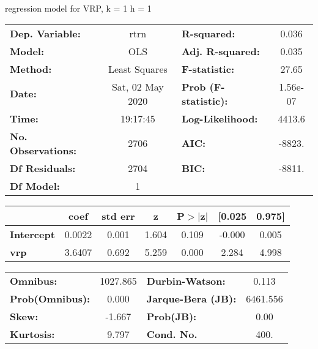 regression model for VRP, k = 1 h = 1\begin{center}
\begin{tabular}{lclc}
\toprule
\textbf{Dep. Variable:}    &       rtrn       & \textbf{  R-squared:         } &     0.036   \\
\textbf{Model:}            &       OLS        & \textbf{  Adj. R-squared:    } &     0.035   \\
\textbf{Method:}           &  Least Squares   & \textbf{  F-statistic:       } &     27.65   \\
\textbf{Date:}             & Sat, 02 May 2020 & \textbf{  Prob (F-statistic):} &  1.56e-07   \\
\textbf{Time:}             &     19:17:45     & \textbf{  Log-Likelihood:    } &    4413.6   \\
\textbf{No. Observations:} &        2706      & \textbf{  AIC:               } &    -8823.   \\
\textbf{Df Residuals:}     &        2704      & \textbf{  BIC:               } &    -8811.   \\
\textbf{Df Model:}         &           1      & \textbf{                     } &             \\
\bottomrule
\end{tabular}
\begin{tabular}{lcccccc}
                   & \textbf{coef} & \textbf{std err} & \textbf{z} & \textbf{P$> |$z$|$} & \textbf{[0.025} & \textbf{0.975]}  \\
\midrule
\textbf{Intercept} &       0.0022  &        0.001     &     1.604  &         0.109        &       -0.000    &        0.005     \\
\textbf{vrp}       &       3.6407  &        0.692     &     5.259  &         0.000        &        2.284    &        4.998     \\
\bottomrule
\end{tabular}
\begin{tabular}{lclc}
\textbf{Omnibus:}       & 1027.865 & \textbf{  Durbin-Watson:     } &    0.113  \\
\textbf{Prob(Omnibus):} &   0.000  & \textbf{  Jarque-Bera (JB):  } & 6461.556  \\
\textbf{Skew:}          &  -1.667  & \textbf{  Prob(JB):          } &     0.00  \\
\textbf{Kurtosis:}      &   9.797  & \textbf{  Cond. No.          } &     400.  \\
\bottomrule
\end{tabular}
\end{center}

